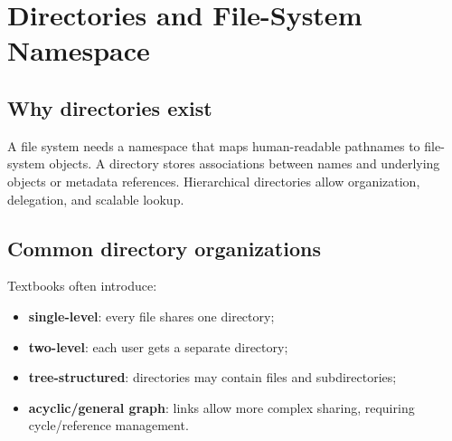 \chapter{Directories and File-System Namespace}\label{ch:directories}

\section{Why directories exist}
A file system needs a namespace that maps human-readable pathnames to file-system objects. A directory stores associations between names and underlying objects or metadata references. Hierarchical directories allow organization, delegation, and scalable lookup.

\section{Common directory organizations}
Textbooks often introduce:
\begin{itemize}
  \item \textbf{single-level}: every file shares one directory;
  \item \textbf{two-level}: each user gets a separate directory;
  \item \textbf{tree-structured}: directories may contain files and subdirectories;
  \item \textbf{acyclic/general graph}: links allow more complex sharing, requiring cycle/reference management.
\end{itemize}

\begin{mlfigure}
\end{mlfigure}

